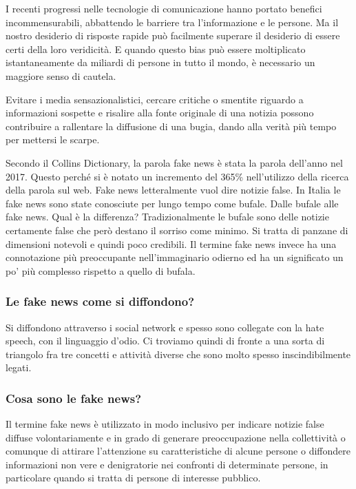 \begin{itshape}
I recenti progressi nelle tecnologie di comunicazione hanno portato benefici incommensurabili, abbattendo le barriere tra l’informazione e le persone. Ma il nostro desiderio di risposte rapide può facilmente superare il desiderio di essere certi della loro veridicità. E quando questo bias può essere moltiplicato istantaneamente da miliardi di persone in tutto il mondo, è necessario un maggiore senso di cautela.

Evitare i media sensazionalistici, cercare critiche o smentite riguardo a informazioni sospette e risalire alla fonte originale di una notizia possono contribuire a rallentare la diffusione di una bugia, dando alla verità più tempo per mettersi le scarpe.
\end{itshape}\par 

Secondo il Collins Dictionary, la parola fake news è stata la parola dell'anno nel 2017. Questo perché si è notato un incremento del 365\% nell'utilizzo della ricerca della parola sul web. 
Fake news letteralmente vuol dire notizie false. In Italia le fake news sono state conosciute per lungo tempo come bufale. 
Dalle bufale alle fake news. Qual è la differenza? Tradizionalmente le bufale sono delle notizie certamente false che però destano il sorriso come minimo. Si tratta di panzane di dimensioni notevoli e quindi poco credibili. Il termine fake news invece ha una connotazione più preoccupante nell'immaginario odierno ed ha un significato un po' più complesso rispetto a quello di bufala.
\subsubsection{Le fake news come si diffondono?} 
Si diffondono attraverso i social network e spesso sono collegate con la hate speech, con il linguaggio d'odio. Ci troviamo quindi di fronte a una sorta di triangolo fra tre concetti e attività diverse che sono molto spesso inscindibilmente legati. 

\subsubsection{Cosa sono le fake news?}
Il termine fake news è utilizzato in modo inclusivo per indicare notizie false diffuse volontariamente e in grado di generare preoccupazione nella collettività o comunque di attirare l'attenzione su caratteristiche di alcune persone o diffondere informazioni non vere e denigratorie nei confronti di determinate persone, in particolare quando si tratta di persone di interesse pubblico.

